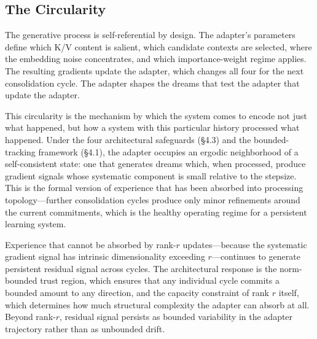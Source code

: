 \documentclass[11pt]{article}
\begin{document}
\subsection{The Circularity}

The generative process is self-referential by design. The adapter's parameters define which K/V content is salient, which candidate contexts are selected, where the embedding noise concentrates, and which importance-weight regime applies. The resulting gradients update the adapter, which changes all four for the next consolidation cycle. The adapter shapes the dreams that test the adapter that update the adapter.

This circularity is the mechanism by which the system comes to encode not just what happened, but how a system with this particular history processed what happened. Under the four architectural safeguards (\S 4.3) and the bounded-tracking framework (\S 4.1), the adapter occupies an ergodic neighborhood of a self-consistent state: one that generates dreams which, when processed, produce gradient signals whose systematic component is small relative to the stepsize. This is the formal version of experience that has been absorbed into processing topology---further consolidation cycles produce only minor refinements around the current commitments, which is the healthy operating regime for a persistent learning system.

Experience that cannot be absorbed by rank-$r$ updates---because the systematic gradient signal has intrinsic dimensionality exceeding $r$---continues to generate persistent residual signal across cycles. The architectural response is the norm-bounded trust region, which ensures that any individual cycle commits a bounded amount to any direction, and the capacity constraint of rank $r$ itself, which determines how much structural complexity the adapter can absorb at all. Beyond rank-$r$, residual signal persists as bounded variability in the adapter trajectory rather than as unbounded drift.
\end{document}
